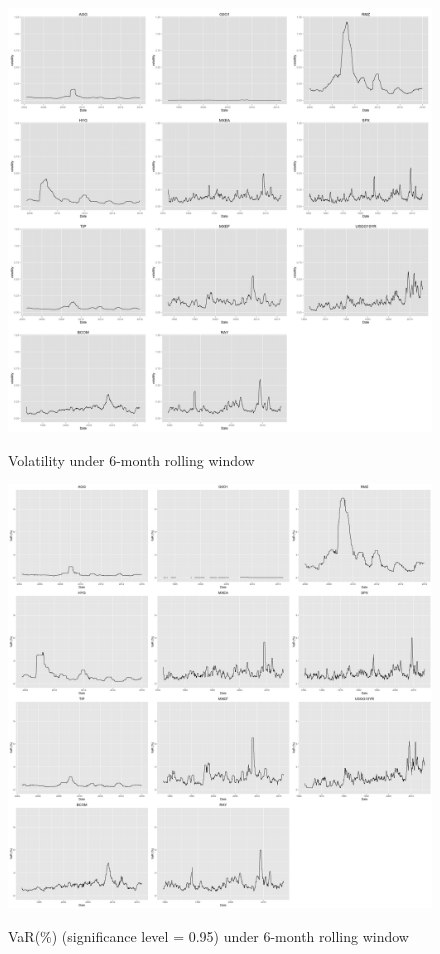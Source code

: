 \documentclass[12pt]{article}
\begin{document}
\begin{figure}[h]
\caption{Volatility under 6-month rolling window} 
\centering 
\includegraphics[width=15cm]{../results/volatility6mon}
\label{fig: variance6mon}
\end{figure}

\begin{figure}[h]
\caption{VaR(\%) (significance level = 0.95) under 6-month rolling window}
\centering 
\includegraphics[width=15cm]{../results/VaR6mon_scaled}
\label{fig: VaR6mon}
\end{figure}
\end{document}
